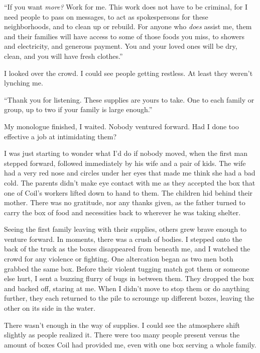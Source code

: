 ``If you want \emph{more?}  Work for me.  This work does not have to be criminal, for I need people to pass on messages, to act as spokespersons for these neighborhoods, and to clean up or rebuild.  For anyone who \emph{does} assist me, them and their families will have access to some of those foods you miss, to showers and electricity, and generous payment.  You and your loved ones will be dry, clean, and you will have fresh clothes.''



I looked over the crowd.  I could see people getting restless.  At least they weren't lynching me.



``Thank you for listening.  These supplies are yours to take.  One to each family or group, up to two if your family is large enough.''



My monologue finished, I waited.  Nobody ventured forward.  Had I done too effective a job at intimidating them?



I was just starting to wonder what I'd do if nobody moved, when the first man stepped forward, followed immediately by his wife and a pair of kids.  The wife had a very red nose and circles under her eyes that made me think she had a bad cold.  The parents didn't make eye contact with me as they accepted the box that one of Coil's workers lifted down to hand to them.  The children hid behind their mother.  There was no gratitude, nor any thanks given, as the father turned to carry the box of food and necessities back to wherever he was taking shelter.



Seeing the first family leaving with their supplies, others grew brave enough to venture forward.  In moments, there was a crush of bodies.  I stepped onto the back of the truck as the boxes disappeared from beneath me, and I watched the crowd for any violence or fighting.  One altercation began as two men both grabbed the same box.  Before their violent tugging match got them or someone else hurt, I sent a buzzing flurry of bugs in between them.  They dropped the box and backed off, staring at me.  When I didn't move to stop them or do anything further, they each returned to the pile to scrounge up different boxes, leaving the other on its side in the water.



There wasn't enough in the way of supplies.  I could see the atmosphere shift slightly as people realized it.  There were too many people present versus the amount of boxes Coil had provided me, even with one box serving a whole family.




